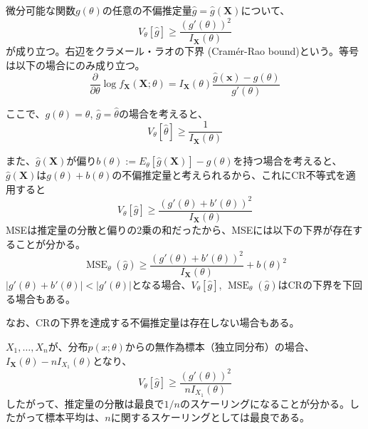 \documentclass[uplatex,dvipdfmx]{jlreq}
\newcommand\term[1]{\textsf{#1}}
\begin{document}
\begin{theorem}
    微分可能な関数$g(\theta)$の任意の不偏推定量$\hat{g}=\hat{g}(\boldsymbol{X})$について、
    \begin{equation}
        V_\theta[\hat{g}] \geq
        \frac{(g'(\theta))^2}{I_{\boldsymbol{X}}(\theta)}
    \end{equation}
    が成り立つ。右辺を\term{クラメール・ラオの下界 (Cram\'{e}r-Rao bound)}という。等号は以下の場合にのみ成り立つ。
    \begin{equation}
        \frac{\partial}{\partial\theta}
        \log f_{\boldsymbol{X}}(\boldsymbol{X}; \theta)
        = I_{\boldsymbol{X}}(\theta)
        \frac{\hat{g}(\boldsymbol{x}) - g(\theta)}{g'(\theta)}
    \end{equation}
\end{theorem}

ここで、$g(\theta)=\theta$, $\hat{g}=\hat{\theta}$の場合を考えると、
\begin{equation}
    V_\theta[\hat{\theta}] \geq \frac{1}{I_{\boldsymbol{X}}(\theta)}
\end{equation}

また、$\hat{g}(\boldsymbol{X})$が偏り$b(\theta):=E_\theta[\hat{g}(\boldsymbol{X})]-g(\theta)$を持つ場合を考えると、$\hat{g}(\boldsymbol{X})$は$g(\theta)+b(\theta)$の不偏推定量と考えられるから、これにCR不等式を適用すると
\begin{equation}
    V_\theta[\hat{g}] \geq
    \frac{(g'(\theta)+b'(\theta))^2}{I_{\boldsymbol{X}}(\theta)}
\end{equation}
MSEは推定量の分散と偏りの2乗の和だったから、MSEには以下の下界が存在することが分かる。
\begin{equation}
    \operatorname{MSE}_\theta(\hat{g}) \geq
    \frac{(g'(\theta)+b'(\theta))^2}{I_{\boldsymbol{X}}(\theta)}
    + b(\theta)^2
\end{equation}
$|g'(\theta)+b'(\theta)|< |g'(\theta)|$となる場合、$V_\theta[\hat{g}]$, $\operatorname{MSE}_\theta(\hat{g})$はCRの下界を下回る場合もある。

なお、CRの下界を達成する不偏推定量は存在しない場合もある。

$X_1, \dotsc, X_n$が、分布$p(x; \theta)$からの無作為標本（独立同分布）の場合、$I_{\boldsymbol{X}}(\theta) - nI_{X_1}(\theta)$となり、
\begin{equation}
    V_\theta[\hat{g}] \geq
    \frac{(g'(\theta))^2}{nI_{X_1}(\theta)}
\end{equation}
したがって、推定量の分散は最良で$1/n$のスケーリングになることが分かる。したがって標本平均は、$n$に関するスケーリングとしては最良である。
\end{document}
